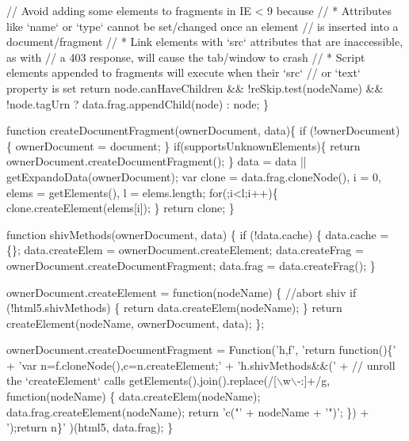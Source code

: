 \begin{DoxyCodeInclude}
    \textcolor{comment}{// Avoid adding some elements to fragments in IE < 9 because}
    \textcolor{comment}{// * Attributes like `name` or `type` cannot be set/changed once an element}
    \textcolor{comment}{//   is inserted into a document/fragment}
    \textcolor{comment}{// * Link elements with `src` attributes that are inaccessible, as with}
    \textcolor{comment}{//   a 403 response, will cause the tab/window to crash}
    \textcolor{comment}{// * Script elements appended to fragments will execute when their `src`}
    \textcolor{comment}{//   or `text` property is set}
    \textcolor{keywordflow}{return} node.canHaveChildren && !reSkip.test(nodeName) && !node.tagUrn ? data.frag.appendChild(node) : 
      node;
  \}

  \textcolor{keyword}{function} createDocumentFragment(ownerDocument, data)\{
    \textcolor{keywordflow}{if} (!ownerDocument) \{
        ownerDocument = document;
    \}
    \textcolor{keywordflow}{if}(supportsUnknownElements)\{
        \textcolor{keywordflow}{return} ownerDocument.createDocumentFragment();
    \}
    data = data || getExpandoData(ownerDocument);
    var clone = data.frag.cloneNode(),
        i = 0,
        elems = getElements(),
        l = elems.length;
    \textcolor{keywordflow}{for}(;i<l;i++)\{
        clone.createElement(elems[i]);
    \}
    \textcolor{keywordflow}{return} clone;
  \}

  \textcolor{keyword}{function} shivMethods(ownerDocument, data) \{
    \textcolor{keywordflow}{if} (!data.cache) \{
        data.cache = \{\};
        data.createElem = ownerDocument.createElement;
        data.createFrag = ownerDocument.createDocumentFragment;
        data.frag = data.createFrag();
    \}


    ownerDocument.createElement = \textcolor{keyword}{function}(nodeName) \{
      \textcolor{comment}{//abort shiv}
      \textcolor{keywordflow}{if} (!html5.shivMethods) \{
          \textcolor{keywordflow}{return} data.createElem(nodeName);
      \}
      \textcolor{keywordflow}{return} createElement(nodeName, ownerDocument, data);
    \};

    ownerDocument.createDocumentFragment = Function(\textcolor{stringliteral}{'h,f'}, \textcolor{stringliteral}{'return function()\{'} +
      \textcolor{stringliteral}{'var n=f.cloneNode(),c=n.createElement;'} +
      \textcolor{stringliteral}{'h.shivMethods&&('} +
        \textcolor{comment}{// unroll the `createElement` calls}
        getElements().join().replace(/[\(\backslash\)w\(\backslash\)-:]+/g, \textcolor{keyword}{function}(nodeName) \{
          data.createElem(nodeName);
          data.frag.createElement(nodeName);
          \textcolor{keywordflow}{return} \textcolor{stringliteral}{'c("'} + nodeName + \textcolor{stringliteral}{'")'};
        \}) +
      \textcolor{stringliteral}{');return n\}'}
    )(html5, data.frag);
  \}


\end{DoxyCodeInclude}
